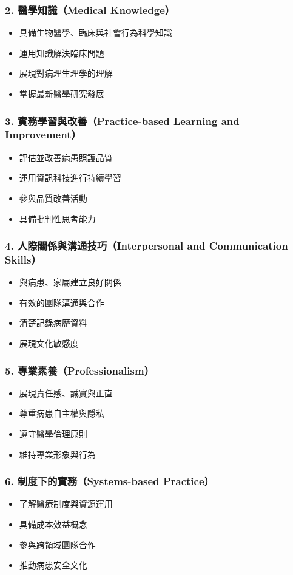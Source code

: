 \documentclass[12pt,a4paper]{article}
\begin{document}
\subsubsection{2. 醫學知識（Medical Knowledge）}
\begin{itemize}[nosep]
    \item 具備生物醫學、臨床與社會行為科學知識
    \item 運用知識解決臨床問題
    \item 展現對病理生理學的理解
    \item 掌握最新醫學研究發展
\end{itemize}
\subsubsection{3. 實務學習與改善（Practice-based Learning and Improvement）}
\begin{itemize}[nosep]
    \item 評估並改善病患照護品質
    \item 運用資訊科技進行持續學習
    \item 參與品質改善活動
    \item 具備批判性思考能力
\end{itemize}
\subsubsection{4. 人際關係與溝通技巧（Interpersonal and Communication Skills）}
\begin{itemize}[nosep]
    \item 與病患、家屬建立良好關係
    \item 有效的團隊溝通與合作
    \item 清楚記錄病歷資料
    \item 展現文化敏感度
\end{itemize}
\subsubsection{5. 專業素養（Professionalism）}
\begin{itemize}[nosep]
    \item 展現責任感、誠實與正直
    \item 尊重病患自主權與隱私
    \item 遵守醫學倫理原則
    \item 維持專業形象與行為
\end{itemize}
\subsubsection{6. 制度下的實務（Systems-based Practice）}
\begin{itemize}[nosep]
    \item 了解醫療制度與資源運用
    \item 具備成本效益概念
    \item 參與跨領域團隊合作
    \item 推動病患安全文化
\end{itemize}
\end{document}
